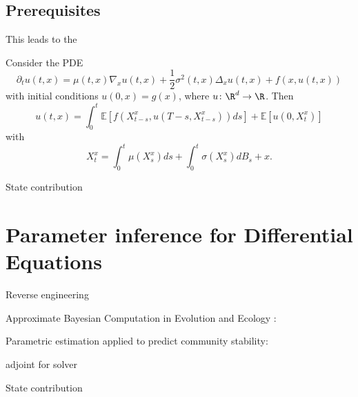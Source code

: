 \subsection*{Prerequisites}
This leads to the 
\begin{theorem}
Consider the PDE
\begin{equation}
    \partial_t u(t,x) = \mu(t, x) \nabla_x u(t,x) + \frac{1}{2} \sigma^2(t, x) \Delta_x u(t,x) + f(x, u(t,x))
\end{equation}
with initial conditions $u(0, x) = g(x)$, where $u \colon \R^d \to \R$. 
Then
\begin{equation}
    u(t, x) = \int_0^t \mathbb{E} \left[ f(X^x_{t - s}, u(T-s, X^x_{t - s}))ds \right] + \mathbb{E} \left[ u(0, X^x_t) \right] \tag{3}
\end{equation}
with 
\begin{equation}
    X_t^x = \int_0^t \mu(X_s^x)ds + \int_0^t\sigma(X_s^x)dB_s + x.
\end{equation}

\end{theorem}

State contribution

\section*{Parameter inference for Differential Equations}

Reverse engineering

Approximate Bayesian Computation in Evolution and Ecology : \citep{Beaumont2010}

Parametric estimation applied to predict community stability: \citep{Cenci2019}

adjoint for solver 

State contribution
